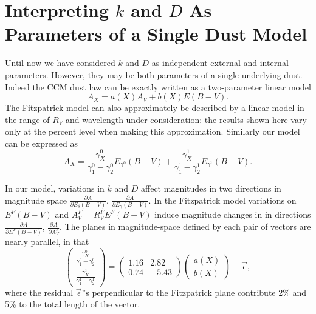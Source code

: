 \documentclass{aastex61}   	%
\begin{document}
\section{Interpreting $k$ and $D$ As Parameters of a Single Dust Model}
Until now we have considered $k$ and $D$ as independent external and internal parameters.  However, they may be both
parameters of a single underlying dust.  Indeed the CCM dust law can be exactly written as a two-parameter linear model
\begin{equation}
A_X = a(X)  A_V + b(X) E(B-V).
\end{equation}
The Fitzpatrick model can also approximately be described by a linear model in the range of $R_V$ and wavelength under consideration:
the results shown here vary only at the percent level when making this approximation.
Similarly our model can be expressed as
\begin{equation}
A_X = \frac{\gamma^0_X}{\gamma^0_1-\gamma^0_2}  E_{\gamma^0}(B-V) +  \frac{\gamma^1_X}{\gamma^1_1-\gamma^1_2}  E_{\gamma^1}(B-V).
\end{equation}

In our model, variations in $k$ and $D$ affect magnitudes in two directions in magnitude space
$\frac{\partial A}{\partial E_\delta(B-V)}$, $\frac{\partial A}{\partial E_\gamma(B-V)}$.  In the Fitzpatrick model
variations on $E^F(B-V)$ and $A^F_V=R^F_VE^F(B-V)$ induce magnitude changes in
in directions
$\frac{\partial A}{\partial E^F(B-V)}$, $\frac{\partial A}{\partial A^F_V}$.
The planes in magnitude-space defined by each pair of vectors are nearly parallel, in that
\begin{equation}
\begin{pmatrix}
 \frac{\gamma^0_X}{\gamma^0_1-\gamma^0_2} \\
\frac{\gamma^1_X}{\gamma^1_1-\gamma^1_2} 
\end{pmatrix}=
\begin{pmatrix}
1.16 & 2.82 \\
0.74 & -5.43
\end{pmatrix} 
\begin{pmatrix}
a(X) \\
b(X)
\end{pmatrix}+
\vec{\epsilon},
\end{equation}
where the residual $\vec{\epsilon}$''s perpendicular to the Fitzpatrick plane
contribute  2\% and 5\% to the total  length of the vector.
\end{document}
